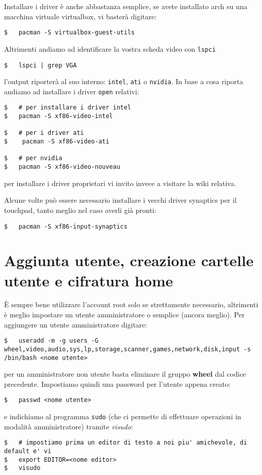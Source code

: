 \documentclass[twoside,italian]{book}
\newcommand{\code}[1]{\texttt{#1}}
\begin{document}
    Installare i driver è anche abbastanza semplice, se avete installato arch su una macchina virtuale virtualbox, vi basterà digitare: 
    \begin{lstlisting}
$   pacman -S virtualbox-guest-utils
    \end{lstlisting}
    Altrimenti andiamo ad identificare la vostra scheda video con \code{lspci} 
    \begin{lstlisting}
$   lspci | grep VGA
    \end{lstlisting}
    l'output riporterà al suo interno: \code{intel}, \code{ati} o \code{nvidia}. In base a cosa riporta andiamo ad installare i driver \code{open} relativi:
\begin{lstlisting}
$   # per installare i driver intel
$   pacman -S xf86-video-intel

$   # per i driver ati
$    pacman -S xf86-video-ati

$   # per nvidia
$   pacman -S xf86-video-nouveau
\end{lstlisting}

    per installare i driver proprietari vi invito invece a visitare la wiki relativa.
    
    Alcune volte può essere necessario installare i vecchi driver synaptics per il touchpad, tanto meglio nel caso averli già pronti:
    \begin{lstlisting}
$   pacman -S xf86-input-synaptics
    \end{lstlisting}

\section{Aggiunta utente, creazione cartelle utente e cifratura home }

    È sempre bene utilizzare l'account root solo se strettamente necessario, altrimenti è meglio impostare un utente amministratore o semplice (ancora meglio).
    Per aggiungere un utente amministratore digitare:
    \begin{lstlisting}
$   useradd -m -g users -G wheel,video,audio,sys,lp,storage,scanner,games,network,disk,input -s /bin/bash <nome utente>
    \end{lstlisting}
    per un amministratore non utente basta eliminare il gruppo \textbf{wheel} dal codice precedente.
    Impostiamo quindi una password per l'utente appena creato: 
    \begin{lstlisting}
$   passwd <nome utente>
    \end{lstlisting}
    e indichiamo al programma \code{sudo} (che ci permette di effettuare operazioni in modalità amministratore) tramite \textit{visudo}:
\begin{lstlisting}
$   # impostiamo prima un editor di testo a noi piu' amichevole, di default e' vi
$   export EDITOR=<nome editor>
$   visudo
\end{lstlisting}
\end{document}
